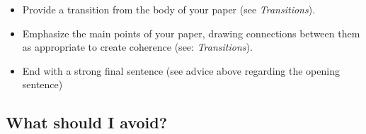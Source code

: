 \documentclass[12pt, hidelinks]{article} %
\begin{document}
\begin{itemize}

\item Provide a transition from the body of your paper (see \emph{Transitions}).
 
\item Emphasize the main points of your paper, drawing connections between them as appropriate to create coherence (see: \emph{Transitions}).
 
\item End with a strong final sentence (see advice above regarding the opening sentence)

\end{itemize}

\subsection{What should I avoid?}
\end{document}
